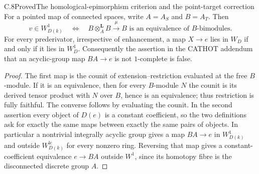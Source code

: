 \begin{claim}{C.8}{Proved}{The homological-epimorphism criterion and the point-target correction}
For a pointed map of connected spaces, write $A=A_S$ and $B=A_T$.  Then
\[
 v\in W_{D(k)}^1\quad\Longleftrightarrow\quad
 B\otimes_A^{\mathbf L}B\xrightarrow{\mu}B\text{ is an equivalence of }B\text{-bimodules}.
\]
For every prederivator, irrespective of enhancement, a map $X\to e$ lies in $W_D$ if and only if it lies in $W_D^1$.  Consequently the assertion in the CATHOT addendum that an acyclic-group map $BA\to e$ is not $1$-complete is false.
\end{claim}
\begin{proof}
The first map is the counit of extension--restriction evaluated at the free $B$-module.  If it is an equivalence, then for every $B$-module $N$ the counit is its derived tensor product with $N$ over $B$, hence is an equivalence; thus restriction is fully faithful.  The converse follows by evaluating the counit.  In the second assertion every object of $D(e)$ is a constant coefficient, so the two definitions ask for exactly the same maps between exactly the same pairs of objects.  In particular a nontrivial integrally acyclic group gives a map $BA\to e$ in $W^1_{D(k)}$ and outside $W^{\mathrm{lc}}_{D(k)}$ for every nonzero ring.  Reversing that map gives a constant-coefficient equivalence $e\to BA$ outside $W^1$, since its homotopy fibre is the disconnected discrete group $A$.
\end{proof}

